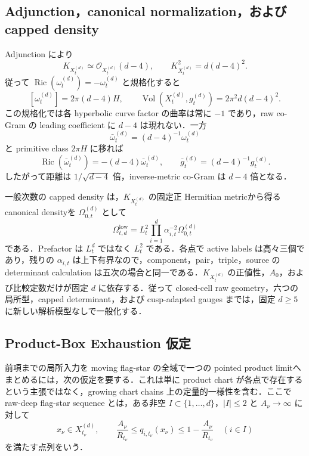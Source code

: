 \documentclass[a4paper,11pt]{ltjsarticle}
\numberwithin{equation}{section}
\theoremstyle{plain}
\theoremstyle{definition}
\theoremstyle{remark}
\newcommand{\Ric}{\operatorname{Ric}}\newcommand{\tr}{\operatorname{tr}}\newcommand{\osc}{\operatorname{osc}}\newcommand{\vol}{\operatorname{Vol}}
\begin{document}
\subsection{Adjunction，canonical normalization，および capped density}

Adjunction により
\begin{equation}\label{eq:degree-d-adjunction}
 K_{X_t^{(d)}}\simeq\mathcal O_{X_t^{(d)}}(d-4),
 \qquad K_{X_t^{(d)}}^2=d(d-4)^2.
\end{equation}
従って $\Ric(\omega_t^{(d)})=-\omega_t^{(d)}$ と規格化すると
\begin{equation}\label{eq:degree-d-normalization}
 [\omega_t^{(d)}]=2\pi(d-4)H,
 \qquad
 \vol(X_t^{(d)},g_t^{(d)})=2\pi^2d(d-4)^2.
\end{equation}
この規格化では各 hyperbolic curve factor の曲率は常に $-1$ であり，raw co-Gram の leading coefficient に $d-4$ は現れない．一方
\begin{equation}\label{eq:degree-d-primitive-normalization}
 \bar\omega_t^{(d)}=(d-4)^{-1}\omega_t^{(d)}
\end{equation}
と primitive class $2\pi H$ に移れば
\[
 \Ric(\bar\omega_t^{(d)})=-(d-4)\bar\omega_t^{(d)},
 \qquad \bar g_t^{(d)}=(d-4)^{-1}g_t^{(d)}.
\]
したがって距離は $1/\sqrt{d-4}$ 倍，inverse-metric co-Gram は
$d-4$ 倍となる．

一般次数の capped density は，$K_{X_t^{(d)}}$ の固定正 Hermitian metricから得る canonical densityを $\Omega_{0,t}^{(d)}$ として
\begin{equation}\label{eq:degree-d-capped-density}
 \Omega_{t,d}^{\mathrm{low}}
 =L_t^2\prod_{i=1}^d\alpha_{i,t}^{-2}\Omega_{0,t}^{(d)}
\end{equation}
である．Prefactor は $L_t^d$ ではなく $L_t^2$ である．各点で active labels は高々三個であり，残りの $\alpha_{i,t}$ は上下有界なので，component，pair，triple，source の determinant calculation は五次の場合と同一である．$K_{X_t^{(d)}}$ の正値性，$A_0$，および比較定数だけが固定 $d$ に依存する．従って closed-cell raw geometry，六つの局所型，capped determinant，および cusp-adapted gauges までは，固定 $d\ge5$ に新しい解析模型なしで一般化する．

\subsection{Product-Box Exhaustion 仮定}

前項までの局所入力を moving flag-star の全域で一つの pointed product limitへまとめるには，次の仮定を要する．これは単に product chart が各点で存在するという主張ではなく，growing chart chains 上の定量的一様性を含む．ここで raw-deep flag-star sequence とは，ある非空 $I\subset\{1,\ldots,d\}$，$|I|\le2$ と $A_\nu\to\infty$ に対して
\[
 x_\nu\in X_{t_\nu}^{(d)},\qquad
 \frac{A_\nu}{R_{t_\nu}}\le q_{i,t_\nu}(x_\nu)
 \le1-\frac{A_\nu}{R_{t_\nu}}\quad(i\in I)
\]
を満たす点列をいう．
\end{document}

